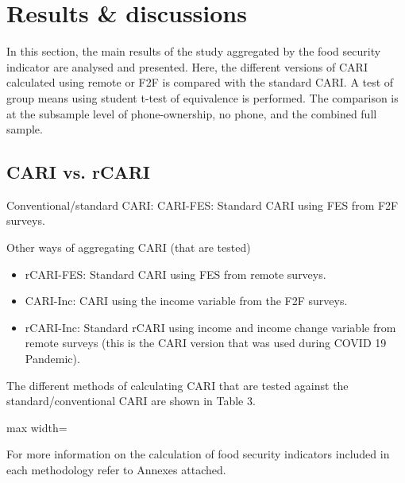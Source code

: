 \documentclass[11pt,harvard]{article}
\begin{document}
\pagebreak

\section{Results \& discussions}
	
In this section, the main results of the study aggregated by the food security indicator are analysed and presented. Here, the different versions of CARI calculated using remote or F2F is compared with the standard CARI. A test of group means using student t-test of equivalence is performed. The comparison is at the subsample level of phone-ownership, no phone, and the combined full sample. 
	
\subsection{CARI vs. rCARI}

Conventional/standard CARI:  CARI-FES: Standard CARI using FES from F2F surveys.

Other ways of aggregating CARI (that are tested)
\begin{itemize}[label=--, left=1.5em]
	\item rCARI-FES: Standard CARI using FES from remote surveys.
	\item CARI-Inc: CARI using the income variable from the F2F surveys.
	\item rCARI-Inc: Standard rCARI using income and income change variable from remote surveys (this is the CARI version that was used during COVID 19 Pandemic).
\end{itemize}

The different methods of calculating CARI that are tested against the standard/conventional CARI are shown in Table 3. 


\begin{table}[htbp]
	\centering
	\begin{adjustbox}{max width=\textwidth}
		\begin{threeparttable}
			\caption{The different versions of CARI \& their indicators}
			\scriptsize
			 
			\label{tab:Aggregation_Table}
		\end{threeparttable}
	\end{adjustbox}
\end{table}

For more information on the calculation of food security indicators included in each methodology refer to Annexes attached. 
\end{document}
